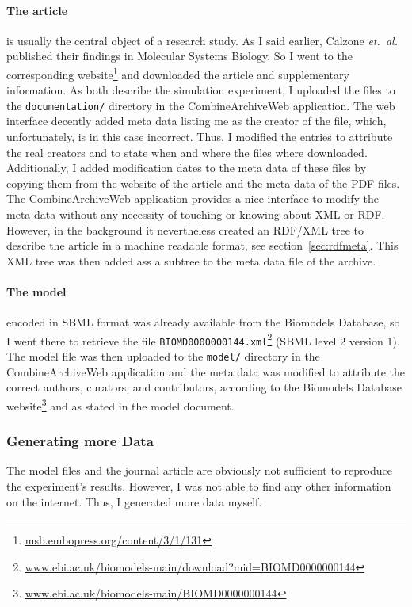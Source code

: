 \paragraph{The article} is usually the central object of a research study. As I said earlier, Calzone \emph{et.~al.} published their findings in Molecular Systems Biology. So I went to the corresponding website\footnote{\href{http://msb.embopress.org/content/3/1/131}{msb.embopress.org/content/3/1/131}} and downloaded the article and supplementary information.
As both describe the simulation experiment, I uploaded the files to the \texttt{documentation/} directory in the CombineArchiveWeb application.
The web interface decently added meta data listing me as the creator of the file, which, unfortunately, is in this case incorrect.
Thus, I modified the entries to attribute the real creators and to state when and where the files where downloaded.
Additionally, I added modification dates to the meta data of these files by copying them from the website of the article and the meta data of the PDF files.
The CombineArchiveWeb application provides a nice interface to modify the meta data without any necessity of touching or knowing about XML or RDF.
However, in the background it nevertheless created an RDF/XML tree to describe the article in a machine readable format, see section~\ref{sec:rdfmeta}.
This XML tree was then added ass a subtree to the meta data file of the archive.


\paragraph{The model} encoded in SBML format was already available from the Biomodels Database, so I went there to retrieve the file \texttt{BIOMD0000000144.xml}\footnote{\href{http://www.ebi.ac.uk/biomodels-main/download?mid=BIOMD0000000144}{www.ebi.ac.uk/biomodels-main/download?mid=BIOMD0000000144}} (SBML level 2 version 1).
The model file was then uploaded to the \texttt{model/} directory in the CombineArchiveWeb application and the meta data was modified to attribute the correct authors, curators, and contributors, according to the Biomodels Database website\footnote{\href{http://www.ebi.ac.uk/biomodels-main/BIOMD0000000144}{www.ebi.ac.uk/biomodels-main/BIOMD0000000144}} and as stated in the model document.


\subsubsection{Generating more Data}
The model files and the journal article are obviously not sufficient to reproduce the experiment's results.
However, I was not able to find any other information on the internet.
Thus, I generated more data myself.

